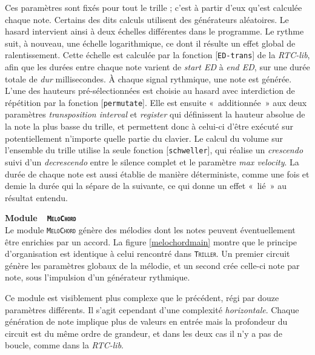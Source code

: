 \documentclass[a4paper,12pt]{article}
\newcommand{\guill}[1]{«~#1~»}
\newcommand{\module}[1]{\texttt{\textsc{#1}}}
\newcommand{\patch}[1]{[\texttt{#1}]}
\begin{document}
Ces paramètres sont fixés pour tout le trille ; c'est à partir d'eux qu'est calculée chaque note. Certains des dits calculs utilisent des générateurs aléatoires. Le hasard intervient ainsi à deux échelles différentes dans le programme. Le rythme suit, à nouveau, une échelle logarithmique, ce dont il résulte un effet global de ralentissement. Cette échelle est calculée par la fonction \patch{ED-trans} de la \emph{RTC-lib}, afin que les durées entre chaque note varient de \emph{start ED} à \emph{end ED}, sur une durée totale de \emph{dur} millisecondes. À chaque signal rythmique, une note est générée. L'une des hauteurs pré-sélectionnées est choisie au hasard avec interdiction de répétition par la fonction \patch{permutate}. Elle est ensuite \guill{additionnée} aux deux paramètres \emph{transposition interval} et \emph{register} qui définissent la hauteur absolue de la note la plus basse du trille, et permettent donc à celui-ci d'être exécuté sur potentiellement n'importe quelle partie du clavier. Le calcul du volume sur l'ensemble du trille utilise la seule fonction \patch{schweller}, qui réalise un \emph{crescendo} suivi d'un \emph{decrescendo} entre le silence complet et le paramètre \emph{max velocity}. La durée de chaque note est aussi établie de manière déterministe, comme une fois et demie la durée qui la sépare de la suivante, ce qui donne un effet \guill{lié} au résultat entendu.

\textbf{Module~~\textnormal{\module{MeloChord}}} \\
Le module \module{MeloChord} génère des mélodies dont les notes peuvent éventuellement être enrichies par un accord. La figure \ref{melochordmain} montre que le principe d'organisation est identique à celui rencontré dans \module{Triller}. Un premier circuit génère les paramètres globaux de la mélodie, et un second crée celle-ci note par note, sous l'impulsion d'un générateur rythmique.

Ce module est visiblement plus complexe que le précédent, régi par douze paramètres différents. Il s'agit cependant d'une complexité \emph{horizontale}. Chaque génération de note implique plus de valeurs en entrée mais la profondeur du circuit est du même ordre de grandeur, et dans les deux cas il n'y a pas de boucle, comme dans la \emph{RTC-lib}.
\end{document}
